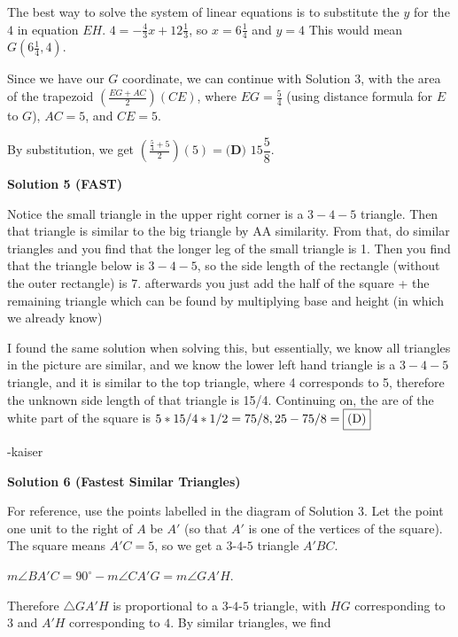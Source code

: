 \begin{enumerate}
 The best way to solve the system of linear equations is to substitute the $y$ for the $4$ in equation $EH$. $4=-\frac{4}{3}x+12 \frac{1}{3}$, so $x=6\frac{1}{4}$ and $y=4$ This would mean $G\left(6\frac{1}{4},4\right)$.

 Since we have our $G$ coordinate, we can continue with Solution 3, with the area of the trapezoid $\left(\frac{EG+AC}{2}\right)(CE)$, where $EG=\frac{5}{4}$ (using distance formula for $E$ to $G$), $AC=5$, and $CE=5$.

 By substitution, we get $\left(\frac{\frac{5}{4}+5}{2}\right)(5)=$$\boxed{\textbf{(D) }15\dfrac{5}{8}}$. 

 



\textbf{Solution 5 (FAST)}

Notice the small triangle in the upper right corner is a $3-4-5$ triangle. Then that triangle is similar to the big triangle by AA similarity. From that, do similar triangles and you find that the longer leg of the small triangle is 1. Then you find that the triangle below is $3-4-5$, so the side length of the rectangle (without the outer rectangle) is 7. afterwards you just add the half of the square + the remaining triangle which can be found by multiplying base and height (in which we already know)

 
I found the same solution when solving this, but essentially, we know all triangles in the picture are similar, and we know the lower left hand triangle is a $3-4-5$ triangle, and it is similar to the top triangle, where 4 corresponds to 5, therefore the unknown side length of that triangle is 15/4. Continuing on, the are of the white part of the square is $5 * 15/4 * 1/2 = 75/8,  25 - 75/8 = \fbox{(D)}$

 
-kaiser

 



\textbf{Solution 6 (Fastest Similar Triangles)}

For reference, use the points labelled in the diagram of Solution 3. Let the point one unit to the right of $A$ be $A'$ (so that $A'$ is one of the vertices of the square). The square means $A'C = 5$, so we get a $3$-$4$-$5$ triangle $A'BC$.

 $m\angle BA'C = 90 ^{\circ} - m\angle CA'G = m\angle GA'H$. 

 Therefore $\triangle GA'H$ is proportional to a $3$-$4$-$5$ triangle, with $HG$ corresponding to $3$ and $A'H$ corresponding to $4$. By similar triangles, we find 


\end{enumerate}
